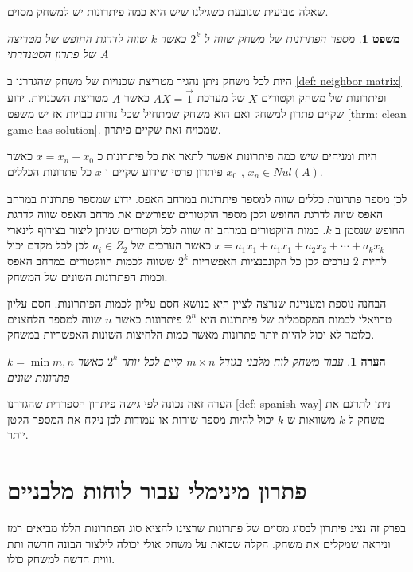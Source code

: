 \documentclass[12pt,twoside]{article}
\newtheorem{theorem}{משפט}[section]
\newtheorem{comm}{הערה}[section]
\begin{document}
שאלה טביעית שנובעת כשגילנו שיש היא כמה פיתרונות יש למשחק מסוים.

\begin{theorem}
    מספר הפתרונות של משחק 
    שווה ל 
    $2^{k}$
    כאשר 
    $k$
    שווה לדרגת החופש של מטריצה
    $A$
    של פתרון הסטנדרתי
\end{theorem}

היות לכל משחק ניתן נהגיר מטריצת שכנויות של משחק שהגדרנו 
ב
\ref{def: neighbor matrix}
ופיתרונות של משחק וקטורים
$X$
של מערכת
$A X = \vec{1}$
כאשר 
$A$
מטריצת השכנויות.
ידוע שקיים פתרון למשחק ואם הוא משחק שמתחיל שכל נורות כבויות אז יש משפט 
\ref{thrm: clean game has solution}.
שמכויח זאת שקיים פיתרון.

היות ומניחים שיש כמה פיתרונות אפשר לתאר את כל פיתרונות כ
$x = x_n + x_0$
כאשר 
$x_n \in Nul(A)$ ,
$x_0$ 
פיתרון פרטי שידוע שקיים 
ו
$x$
כל פתרונות הכללים.

לכן מספר פתרונות כללים שווה למספר פיתרונות במרחב האפס.
ידוע שמספר פתרונות במרחב האפס שווה לדרגת החופש ולכן מספר הוקטורים שפורשים
את מרחב האפס שווה לדרגת החופש שנסמן ב
$k$.
כמות הווקטורים במרחב זה שווה לכל וקטורים שניתן ליצור בצירוף לינארי 
$x = a_1 x_1 + a_1 x_1 + a_2 x_2 + \cdots + a_k x_k$
כאשר הערכים של
$a_i \in Z_2$
לכן 
לכל מקדם יכול להיות
$2$
ערכים
לכן כל הקונבנציות האפשריות 
$2^k$
ששווה
לכמות הווקטורים 
במרחב האפס וכמות הפתרונות השונים של המשחק.

הבחנה נוספת ומעניינת שנרצה לציין היא בנושא חסם עליון לכמות הפיתרונות.
חסם עליון טרויאלי לכמות המקסמלית של פיתרונות היא 
$2^n$
פיתרונות כאשר
$n$
שווה למספר הלחצנים כלומר לא יכול להיות יותר פתרונות מאשר כמות הלחיצות השונות האפשריות במשחק.

\begin{comm}
    עבור משחק לוח מלבני
    בגודל 
    $m \times n$
    קיים לכל יותר 
    $2^k$
    כאשר 
    $k = \min{m,n}$
    פתרונות שונים
\end{comm}
הערה זאה נכונה לפי גישה פיתרון הספרדית
שהגדרנו
\ref{def: spanish way}
ניתן לתרגם את משחק ל
$k$
משוואות 
ש
$k$
יכול להיות מספר שורות או עמודות 
לכן ניקח את המספר הקטן יותר.

\section{פתרון מינימלי עבור לוחות מלבניים}



בפרק זה נציג פיתרון לבסוג מסוים של פתרונות שרצינו להציא סוג הפתרונות הללו
מביאים רמז וניראה שמקלים את משחק. הקלה שכזאת על משחק אולי 
יכולה לילצור הבונה חדשה ותת זווית חדשה למשחק כולו.
\end{document}
